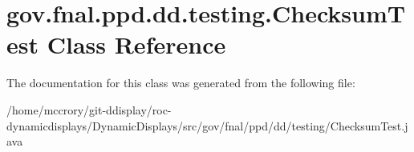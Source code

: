 \hypertarget{classgov_1_1fnal_1_1ppd_1_1dd_1_1testing_1_1ChecksumTest}{\section{gov.\-fnal.\-ppd.\-dd.\-testing.\-Checksum\-Test Class Reference}
\label{classgov_1_1fnal_1_1ppd_1_1dd_1_1testing_1_1ChecksumTest}
}


The documentation for this class was generated from the following file\-:\begin{DoxyCompactItemize}
\item 
/home/mccrory/git-\/ddisplay/roc-\/dynamicdisplays/\-Dynamic\-Displays/src/gov/fnal/ppd/dd/testing/Checksum\-Test.\-java\end{DoxyCompactItemize}
